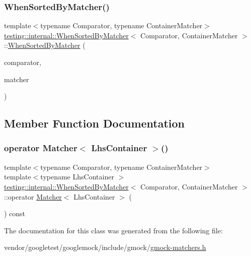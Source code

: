 \subsubsection{\texorpdfstring{When\+Sorted\+By\+Matcher()}{WhenSortedByMatcher()}}
{\footnotesize\ttfamily template$<$typename Comparator, typename Container\+Matcher$>$ \\
\hyperlink{classtesting_1_1internal_1_1_when_sorted_by_matcher}{testing\+::internal\+::\+When\+Sorted\+By\+Matcher}$<$ Comparator, Container\+Matcher $>$\+::\hyperlink{classtesting_1_1internal_1_1_when_sorted_by_matcher}{When\+Sorted\+By\+Matcher} (\begin{DoxyParamCaption}\item[{const Comparator \&}]{comparator,  }\item[{const Container\+Matcher \&}]{matcher }\end{DoxyParamCaption})\hspace{0.3cm}{\ttfamily [inline]}}



\subsection{Member Function Documentation}
\mbox{\label{classtesting_1_1internal_1_1_when_sorted_by_matcher_ae76285fee36055ffde63492102d3c67f}} 
\subsubsection{\texorpdfstring{operator Matcher$<$ Lhs\+Container $>$()}{operator Matcher< LhsContainer >()}}
{\footnotesize\ttfamily template$<$typename Comparator, typename Container\+Matcher$>$ \\
template$<$typename Lhs\+Container $>$ \\
\hyperlink{classtesting_1_1internal_1_1_when_sorted_by_matcher}{testing\+::internal\+::\+When\+Sorted\+By\+Matcher}$<$ Comparator, Container\+Matcher $>$\+::operator \hyperlink{classtesting_1_1_matcher}{Matcher}$<$ Lhs\+Container $>$ (\begin{DoxyParamCaption}{ }\end{DoxyParamCaption}) const\hspace{0.3cm}{\ttfamily [inline]}}



The documentation for this class was generated from the following file\+:\begin{DoxyCompactItemize}
\item 
vendor/googletest/googlemock/include/gmock/\hyperlink{gmock-matchers_8h}{gmock-\/matchers.\+h}\end{DoxyCompactItemize}
